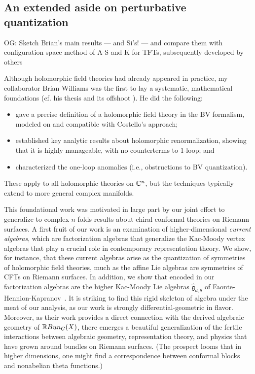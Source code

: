 \documentclass[11pt]{amsart}
\def\g{{\mathfrak g}}
\def\owen#1{{\textcolor{violet!65!black}{OG: {#1}}}}
\begin{document}
\subsection{An extended aside on perturbative quantization}

\owen{Sketch Brian's main results --- and Si's! --- and compare them with configuration space method of A-S and K for TFTs, subsequently developed by others}

Although holomorphic field theories had already appeared in practice,
my collaborator Brian Williams was the first to lay a systematic, mathematical foundations (cf. his thesis \cite{BWthesis} and its offshoot \cite{BWhol}).
He did the following:
\begin{itemize}
\item gave a precise definition of a holomorphic field theory in the BV formalism,
modeled on and compatible with Costello's approach;
\item established key analytic results about holomorphic renormalization, 
showing that it is highly manageable, with no counterterms to 1-loop; and
\item characterized the one-loop anomalies  (i.e., obstructions to BV quantization).
\end{itemize}
These apply to all holomorphic theories on $\mathbb C^n$,
but the techniques typically extend to more general complex manifolds.

This foundational work was motivated in large part by our joint effort to generalize to complex $n$-folds results about chiral conformal theories on Riemann surfaces.
A first fruit of our work \cite{GWcurr} is an examination of higher-dimensional {\em current algebras},
which are factorization algebras that generalize the Kac-Moody vertex algebras that play a crucial role in contemporary representation theory.
We show, for instance, that these current algebras arise as the quantization of symmetries of holomorphic field theories, 
much as the affine Lie algebras are symmetries of CFTs on Riemann surfaces.
In addition, we show that encoded in our factorization algebras are the higher Kac-Moody Lie algebras $\widehat{\g}_{d,\theta}$ of Faonte-Hennion-Kapranov~\cite{FHK}. 
It is striking to find this rigid skeleton of algebra under the meat of our analysis,
as our work is strongly differential-geometric in flavor.
Moreover, as their work provides a direct connection with the derived algebraic geometry of $\mathbb R Bun_G(X)$,
there emerges a beautiful generalization of the fertile interactions between algebraic geometry, representation theory, and physics that have grown around bundles on Riemann surfaces.
(The prospect looms that in higher dimensions,
one might find a correspondence between conformal blocks and nonabelian theta functions.)
\end{document}
